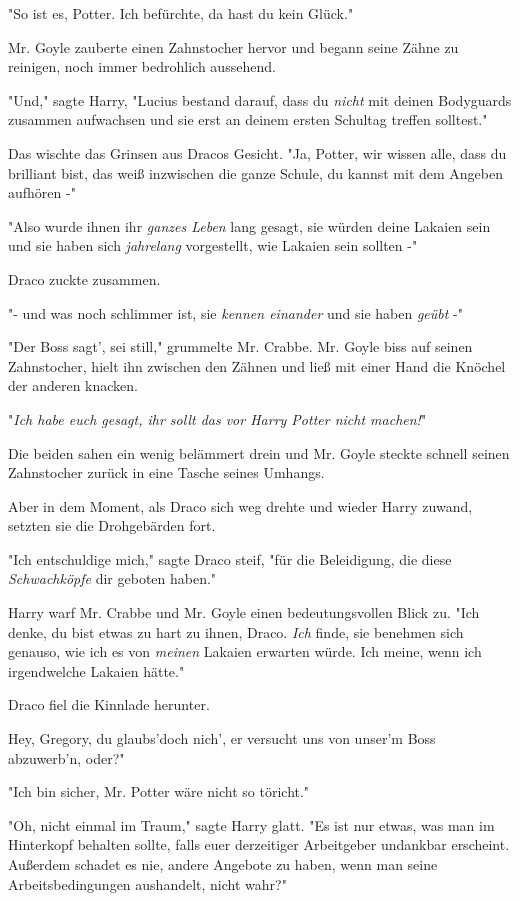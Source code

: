 {"So ist es, Potter. Ich befürchte, da hast du kein Glück."

Mr. Goyle zauberte einen Zahnstocher hervor und begann seine Zähne zu reinigen, noch immer bedrohlich aussehend.

"Und," sagte Harry, "Lucius bestand darauf, dass du \emph{nicht} mit deinen Bodyguards zusammen aufwachsen und sie erst an deinem ersten Schultag treffen solltest."

Das wischte das Grinsen aus Dracos Gesicht. "Ja, Potter, wir wissen alle, dass du brilliant bist, das weiß inzwischen die ganze Schule, du kannst mit dem Angeben aufhören -"

"Also wurde ihnen ihr \emph{ganzes Leben} lang gesagt, sie würden deine Lakaien sein und sie haben sich \emph{jahrelang} vorgestellt, wie Lakaien sein sollten -"

Draco zuckte zusammen.

"- und was noch schlimmer ist, sie \emph{kennen einander} und sie haben \emph{geübt} -"

"Der Boss sagt', sei still," grummelte Mr. Crabbe. Mr. Goyle biss auf seinen Zahnstocher, hielt ihn zwischen den Zähnen und ließ mit einer Hand die Knöchel der anderen knacken.

"\emph{Ich habe euch gesagt, ihr sollt das vor Harry Potter nicht machen!}"

Die beiden sahen ein wenig belämmert drein und Mr. Goyle steckte schnell seinen Zahnstocher zurück in eine Tasche seines Umhangs.

Aber in dem Moment, als Draco sich weg drehte und wieder Harry zuwand, setzten sie die Drohgebärden fort.

"Ich entschuldige mich," sagte Draco steif, "für die Beleidigung, die diese \emph{Schwachköpfe} dir geboten haben."

Harry warf Mr. Crabbe und Mr. Goyle einen bedeutungsvollen Blick zu. "Ich denke, du bist etwas zu hart zu ihnen, Draco. \emph{Ich} finde, sie benehmen sich genauso, wie ich es von \emph{meinen} Lakaien erwarten würde. Ich meine, wenn ich irgendwelche Lakaien hätte."

Draco fiel die Kinnlade herunter.

Hey, Gregory, du glaubs'doch nich', er versucht uns von unser'm Boss abzuwerb'n, oder?"

"Ich bin sicher, Mr. Potter wäre nicht so töricht."

"Oh, nicht einmal im Traum," sagte Harry glatt. "Es ist nur etwas, was man im Hinterkopf behalten sollte, falls euer derzeitiger Arbeitgeber undankbar erscheint. Außerdem schadet es nie, andere Angebote zu haben, wenn man seine Arbeitsbedingungen aushandelt, nicht wahr?"

}
